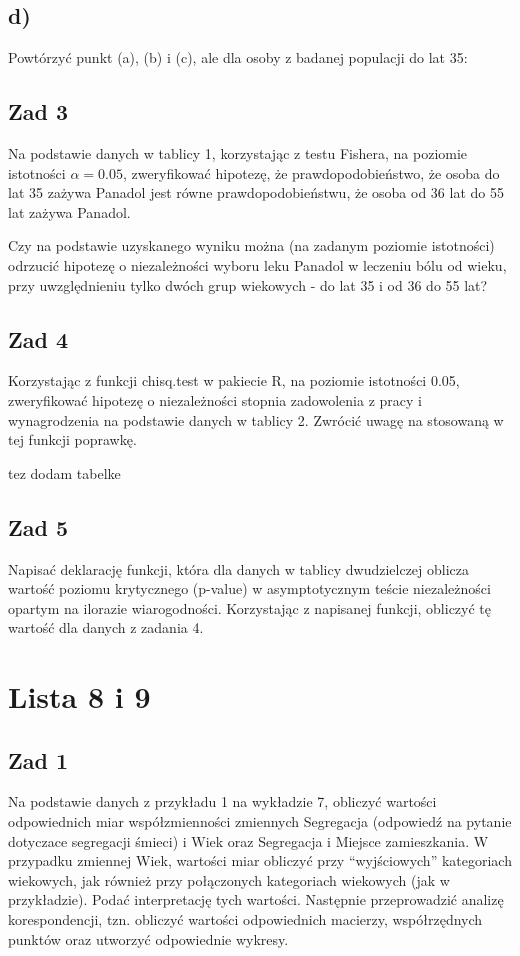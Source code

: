 \documentclass[12pt]{mwart}\usepackage[]{graphicx}\usepackage[]{color}
\begin{document}
\subsection*{d)}
Powtórzyć punkt (a), (b) i (c), ale dla osoby z badanej populacji do lat 35:

\subsection*{Zad 3}
Na podstawie danych w tablicy 1, korzystając z testu Fishera, na poziomie istotności $\alpha = 0.05$, zweryfikować hipotezę, że prawdopodobieństwo, że osoba do lat 35 zażywa Panadol jest równe prawdopodobieństwu, że osoba od 36 lat do 55 lat zażywa Panadol.


Czy na podstawie uzyskanego wyniku można (na zadanym poziomie istotności) odrzucić hipotezę o niezależności wyboru leku Panadol w leczeniu bólu od wieku, przy uwzględnieniu tylko dwóch grup wiekowych - do lat 35 i od 36 do 55 lat?


\subsection*{Zad 4}
Korzystając z funkcji chisq.test w pakiecie R, na poziomie istotności 0.05, zweryfikować hipotezę o niezależności stopnia zadowolenia z pracy i wynagrodzenia na podstawie danych w tablicy 2. Zwrócić uwagę na stosowaną w tej funkcji poprawkę.

tez dodam tabelke


\subsection*{Zad 5}
Napisać deklarację funkcji, która dla danych w tablicy dwudzielczej oblicza wartość poziomu krytycznego (p-value) w asymptotycznym teście niezależności opartym na ilorazie wiarogodności. Korzystając z napisanej funkcji, obliczyć tę wartość dla danych z zadania 4.

\section*{Lista 8 i 9}
\subsection*{Zad 1}
Na podstawie danych z przykładu 1 na wykładzie 7, obliczyć wartości odpowiednich
miar współzmienności zmiennych Segregacja (odpowiedź na pytanie dotyczace segregacji śmieci) i Wiek oraz Segregacja i Miejsce zamieszkania. W przypadku zmiennej
Wiek, wartości miar obliczyć przy “wyjściowych” kategoriach wiekowych, jak również przy połączonych kategoriach wiekowych (jak w przykładzie). Podać interpretację tych wartości. Następnie przeprowadzić analizę korespondencji, tzn. obliczyć wartości odpowiednich macierzy, współrzędnych punktów oraz utworzyć odpowiednie wykresy.
\end{document}
